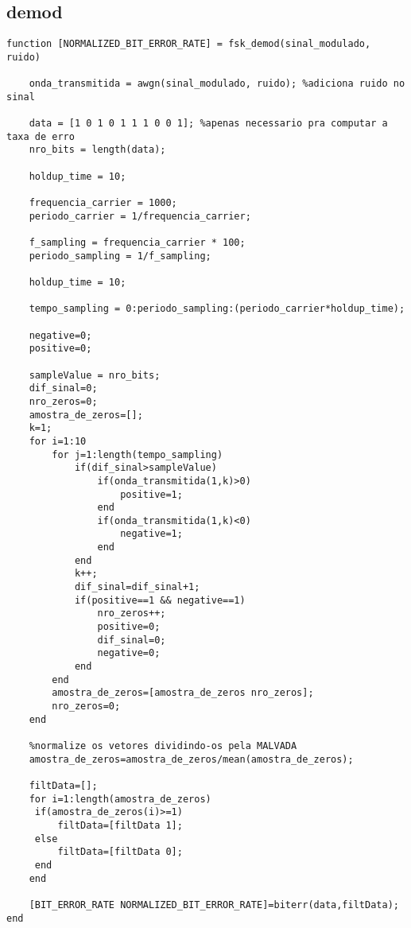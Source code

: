 \documentclass[11pt,a4paper]{report}
\begin{document}
	
	\subsection{demod}
	
	\begin{verbatim}
function [NORMALIZED_BIT_ERROR_RATE] = fsk_demod(sinal_modulado, ruido)

    onda_transmitida = awgn(sinal_modulado, ruido); %adiciona ruido no sinal

    data = [1 0 1 0 1 1 1 0 0 1]; %apenas necessario pra computar a taxa de erro
    nro_bits = length(data);

    holdup_time = 10;

    frequencia_carrier = 1000; 
    periodo_carrier = 1/frequencia_carrier;

    f_sampling = frequencia_carrier * 100;
    periodo_sampling = 1/f_sampling;

    holdup_time = 10;
    
    tempo_sampling = 0:periodo_sampling:(periodo_carrier*holdup_time);

    negative=0;
    positive=0;

    sampleValue = nro_bits;
    dif_sinal=0;
    nro_zeros=0;
    amostra_de_zeros=[];
    k=1;
    for i=1:10
        for j=1:length(tempo_sampling)
            if(dif_sinal>sampleValue)
                if(onda_transmitida(1,k)>0)
                    positive=1;    
                end
                if(onda_transmitida(1,k)<0)
                    negative=1;
                end
            end
            k++;
            dif_sinal=dif_sinal+1;
            if(positive==1 && negative==1)
                nro_zeros++;
                positive=0;
                dif_sinal=0;
                negative=0;
            end
        end
        amostra_de_zeros=[amostra_de_zeros nro_zeros];
        nro_zeros=0;     
    end

    %normalize os vetores dividindo-os pela MALVADA
    amostra_de_zeros=amostra_de_zeros/mean(amostra_de_zeros);

    filtData=[];
    for i=1:length(amostra_de_zeros)
     if(amostra_de_zeros(i)>=1)
         filtData=[filtData 1];
     else
         filtData=[filtData 0];
     end
    end

    [BIT_ERROR_RATE NORMALIZED_BIT_ERROR_RATE]=biterr(data,filtData);
end
	
	\end{verbatim}
	
\end{document}
